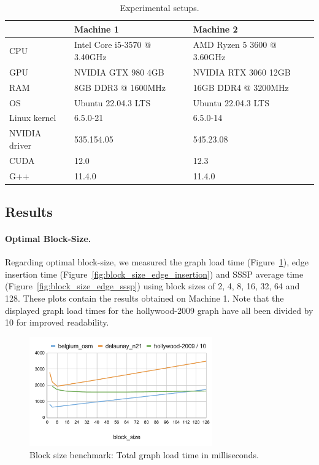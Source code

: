 \begin{table}
    \centering
    \small
        \begin{tabular}{|l|l|l|}
            \hline
            & \textbf{Machine 1} & \textbf{Machine 2} \\
            \hline
            \hline
            CPU & Intel Core i5-3570 @ 3.40GHz & AMD Ryzen 5 3600 @ 3.60GHz \\
            GPU & NVIDIA GTX 980 4GB & NVIDIA RTX 3060 12GB \\
            RAM & 8GB DDR3 @ 1600MHz & 16GB DDR4 @ 3200MHz\\
            OS & Ubuntu 22.04.3 LTS & Ubuntu 22.04.3 LTS \\
            Linux kernel & 6.5.0-21 & 6.5.0-14 \\
            NVIDIA driver & 535.154.05 & 545.23.08 \\
            CUDA  & 12.0 & 12.3 \\
            G++   &  11.4.0 & 11.4.0 \\
            \hline
        \end{tabular}
    \caption{Experimental setups.}
    \label{tab:machines}
\end{table}



\subsection{Results}

\paragraph{\textbf{Optimal Block-Size}.} Regarding optimal block-size, we measured the graph load time (Figure~\ref{fig:block_size_graph_load}), edge insertion time (Figure~\ref{fig:block_size_edge_insertion}) and \gls{SSSP} average time (Figure~\ref{fig:block_size_edge_sssp}) using block sizes of 2, 4, 8, 16, 32, 64 and 128. These plots contain the results obtained on Machine 1. Note that the displayed graph load times for the hollywood-2009 graph have all been divided by 10 for improved readability.

\begin{figure}
    \centering
    \includegraphics[width=0.7\textwidth]{Chapters/Figures/plots/block_size_graph_load.pdf}
    \caption{Block size benchmark: Total graph load time in milliseconds.}
    \label{fig:block_size_graph_load}
\end{figure}

